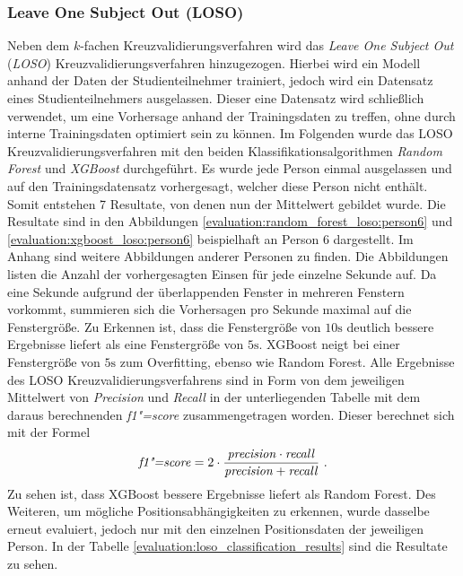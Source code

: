 \subsubsection{Leave One Subject Out (LOSO)}
Neben dem $k$-fachen Kreuzvalidierungsverfahren wird das \textit{Leave One Subject Out} (\textit{LOSO}) Kreuzvalidierungsverfahren hinzugezogen. 
Hierbei wird ein Modell anhand der Daten der Studienteilnehmer trainiert, jedoch wird ein Datensatz eines Studienteilnehmers ausgelassen. 
Dieser eine Datensatz wird schließlich verwendet, um eine Vorhersage anhand der Trainingsdaten zu treffen, ohne durch interne Trainingsdaten optimiert sein zu können.
Im Folgenden wurde das LOSO Kreuzvalidierungsverfahren mit den beiden Klassifikationsalgorithmen \textit{Random Forest} und \textit{XGBoost} durchgeführt. 
Es wurde jede Person einmal ausgelassen und auf den Trainingsdatensatz vorhergesagt, welcher diese Person nicht enthält. 
Somit entstehen 7 Resultate, von denen nun der Mittelwert gebildet wurde.
Die Resultate sind in den Abbildungen \ref{evaluation:random_forest_loso:person6} und \ref{evaluation:xgboost_loso:person6} beispielhaft an Person 6 dargestellt.
Im Anhang sind weitere Abbildungen anderer Personen zu finden.
Die Abbildungen listen die Anzahl der vorhergesagten Einsen für jede einzelne Sekunde auf. 
Da eine Sekunde aufgrund der überlappenden Fenster in mehreren Fenstern vorkommt, summieren sich die Vorhersagen pro Sekunde maximal auf die Fenstergröße.
Zu Erkennen ist, dass die Fenstergröße von $10\si{\s}$ deutlich bessere Ergebnisse liefert als eine Fenstergröße von $5\si{\s}$. 
XGBoost neigt bei einer Fenstergröße von $5\si{\s}$ zum Overfitting, ebenso wie Random Forest. 
Alle Ergebnisse des LOSO Kreuzvalidierungsverfahrens sind in Form von dem jeweiligen Mittelwert von \textit{Precision} und \textit{Recall} in der unterliegenden Tabelle mit dem daraus berechnenden \textit{f1"=score} zusammengetragen worden.
Dieser berechnet sich mit der Formel
\[\text{\textit{f1"=score}} = 2 \cdot \frac{\text{\textit{precision}} \cdot \text{\textit{recall}}}{\text{\textit{precision}} + \text{\textit{recall}}}\text{ .}\]
Zu sehen ist, dass XGBoost bessere Ergebnisse liefert als Random Forest.
Des Weiteren, um mögliche Positionsabhängigkeiten zu erkennen, wurde dasselbe erneut evaluiert, jedoch nur mit den einzelnen Positionsdaten der jeweiligen Person. 
In der Tabelle \ref{evaluation:loso_classification_results} sind die Resultate zu sehen.

